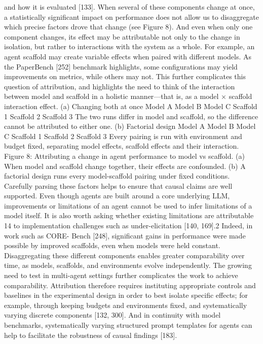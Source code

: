 and how it is evaluated [133]. When several of these components change at once, a statistically significant
impact on performance does not allow us to disaggregate which precise factors drove that change (see
Figure 8). And even when only one component changes, its effect may be attributable not only to the
change in isolation, but rather to interactions with the system as a whole.
For example, an agent scaffold may create variable effects when paired with different models. As the
PaperBench [252] benchmark highlights, some configurations may yield improvements on metrics, while
others may not. This further complicates this question of attribution, and highlights the need to think of
the interaction between model and scaffold in a holistic manner—that is, as a model × scaffold interaction
effect.
(a) Changing both at once
Model A
Model B
Model C
Scaffold 1
Scaffold 2
Scaffold 3
The two runs differ in model and scaffold, so the
difference cannot be attributed to either one.
(b) Factorial design
Model A
Model B
Model C
Scaffold 1
Scaffold 2
Scaffold 3
Every pairing is run with environment and budget
fixed, separating model effects, scaffold effects and
their interaction.
Figure 8: Attributing a change in agent performance to model vs scaffold. (a) When model and scaffold change
together, their effects are confounded. (b) A factorial design runs every model-scaffold pairing under fixed conditions.
Carefully parsing these factors helps to ensure that causal claims are well supported. Even though agents
are built around a core underlying LLM, improvements or limitations of an agent cannot be used to
infer limitations of a model itself. It is also worth asking whether existing limitations are attributable
14
to implementation challenges such as under-elicitation [140, 169].2 Indeed, in work such as CORE-
Bench [248], significant gains in performance were made possible by improved scaffolds, even when models
were held constant.
Disaggregating these different components enables greater comparability over time, as models, scaffolds, and
environments evolve independently. The growing need to test in multi-agent settings further complicates
the work to achieve comparability. Attribution therefore requires instituting appropriate controls and
baselines in the experimental design in order to best isolate specific effects; for example, through keeping
budgets and environments fixed, and systematically varying discrete components [132, 300]. And in
continuity with model benchmarks, systematically varying structured prompt templates for agents can help
to facilitate the robustness of causal findings [183].
